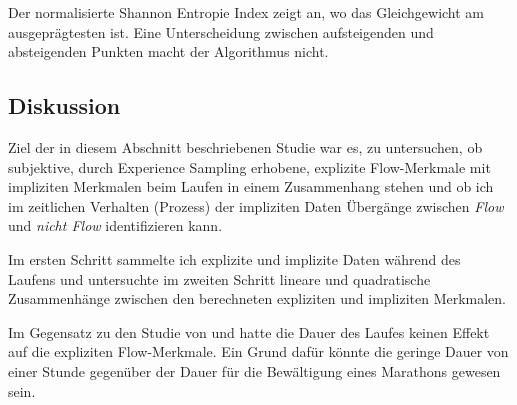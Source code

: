 Der normalisierte Shannon Entropie Index zeigt an, wo das Gleichgewicht am ausgeprägtesten ist. Eine Unterscheidung zwischen aufsteigenden und absteigenden Punkten macht der Algorithmus nicht. 

\subsection{Diskussion} 

\label{sub:diskussion_5_1}

Ziel der in diesem Abschnitt beschriebenen Studie war es, zu untersuchen, ob subjektive, durch Experience Sampling erhobene, explizite Flow-Merkmale mit impliziten Merkmalen beim Laufen in einem Zusammenhang stehen und ob ich im zeitlichen Verhalten (Prozess) der impliziten Daten Übergänge zwischen \emph{Flow} und \emph{nicht Flow} identifizieren kann. 

Im ersten Schritt sammelte ich explizite und implizite Daten während des Laufens und untersuchte im zweiten Schritt lineare und quadratische Zusammenhänge zwischen den berechneten expliziten und impliziten Merkmalen. 

Im Gegensatz zu den Studie von \citet{Stoll2005} und \citet{Schuler2009} hatte die Dauer des Laufes keinen Effekt auf die expliziten Flow-Merkmale. Ein Grund dafür könnte die geringe Dauer von einer Stunde gegenüber der Dauer für die Bewältigung eines Marathons gewesen sein.

